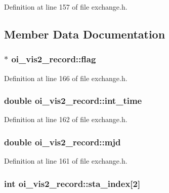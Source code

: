 Definition at line 157 of file exchange.h.



\subsection{Member Data Documentation}
\hypertarget{structoi__vis2__record_adff8b3553966c55ab1e7e7f8ca6a984d}{
\subsubsection[{flag}]{$\ast$ {\bf oi\_\-vis2\_\-record::flag}}}
\label{structoi__vis2__record_adff8b3553966c55ab1e7e7f8ca6a984d}


Definition at line 166 of file exchange.h.

\hypertarget{structoi__vis2__record_a897500d0a2d8d7872db27f5d3f3699cd}{
\subsubsection[{int\_\-time}]{\setlength{\rightskip}{0pt plus 5cm}double {\bf oi\_\-vis2\_\-record::int\_\-time}}}
\label{structoi__vis2__record_a897500d0a2d8d7872db27f5d3f3699cd}


Definition at line 162 of file exchange.h.

\hypertarget{structoi__vis2__record_ae92d1c7889d59a87cea5a630c5c25ca7}{
\subsubsection[{mjd}]{\setlength{\rightskip}{0pt plus 5cm}double {\bf oi\_\-vis2\_\-record::mjd}}}
\label{structoi__vis2__record_ae92d1c7889d59a87cea5a630c5c25ca7}


Definition at line 161 of file exchange.h.

\hypertarget{structoi__vis2__record_acd326aca20e90619e65415d15311a51c}{
\subsubsection[{sta\_\-index}]{\setlength{\rightskip}{0pt plus 5cm}int {\bf oi\_\-vis2\_\-record::sta\_\-index}\mbox{[}2\mbox{]}}}
\label{structoi__vis2__record_acd326aca20e90619e65415d15311a51c}


